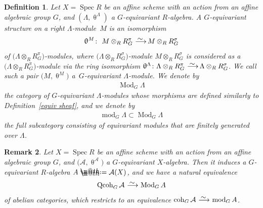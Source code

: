 \documentclass[11pt]{article}
\makeatletter
\numberwithin{equation}{section}
\newtheorem{dfn}{Definition}[section]
\newtheorem{rem}[dfn]{Remark}
\newcommand*{\defeq}{\mathrel{\rlap{%
 \raisebox{0.3ex}{$\m@th\cdot$}}%
 \raisebox{-0.3ex}{$\m@th\cdot$}}%
 =}
\numberwithin{equation}{section}
\newcommand{\Spec}{\operatorname{Spec}}
\newcommand{\coh}{\operatorname{coh}}
\newcommand{\Qcoh}{\operatorname{Qcoh}}
\newcommand{\Mod}{\operatorname{Mod}}
\newcommand{\fmod}{\operatorname{mod}}
\newcommand{\cA}{\mathcal{A}}
\newcommand{\simto}{\,\,\,\,\raisebox{4pt}{$\sim$}{\kern -1.1em \longrightarrow}\,}
\makeatother
\begin{document}
\begin{dfn}%
Let $X=\Spec R$ be an affine scheme with an action from an affine algebraic group $G$, and $(\Lambda,\uptheta^{\Lambda})$ a $G$-equivariant $R$-algebra. A {\it $G$-equivariant structure} on a right $\Lambda$-module~$M$ is an isomorphism
\begin{gather*}
\uptheta^M\colon\ M\otimes_RR_G^{\pi}\simto M\otimes_RR_G^{\sigma}
\end{gather*}
of $\big(\Lambda\otimes_RR_G^{\pi}\big)$-modules, where $\big(\Lambda\otimes_RR_G^{\sigma}\big)$-module $M\otimes_RR_G^{\sigma}$ is considered as a $\big(\Lambda\otimes_RR_G^{\pi}\big)$-mo\-dule via the ring isomorphism $\uptheta^{\Lambda}\colon \Lambda\otimes_RR_G^{\pi}\simto\Lambda\otimes_RR_G^{\sigma}$. We call such a pair $\big(M,\uptheta^M\big)$ a~{\it $G$-equivariant $\Lambda$-module}. We denote by
\begin{gather*}
\Mod_G\Lambda
\end{gather*}
the category of $G$-equivariant $\Lambda$-modules whose morphisms are defined similarly to Definition~\ref{equiv sheaf}, and we denote by
\begin{gather*}
\fmod_G\Lambda\subset \Mod_G\Lambda
\end{gather*}
the full subcategory consisting of equivariant modules that are finitely generated over $\Lambda$.
\end{dfn}

\begin{rem}
Let $X=\Spec R$ be an affine scheme with an action from an affine algebraic group $G$, and $\big(\cA,\uptheta^{\cA}\big)$ a $G$-equivariant $X$-algebra. Then it induces a $G$-equivariant $R$-algebra $A\defeq\cA(X)$, and we have a natural equivalence
\begin{gather*}
\Qcoh_G\cA\simto\Mod_GA
\end{gather*}
of abelian categories, which restricts to an equivalence $\coh_G\cA\simto\fmod_GA$.
\end{rem}
\vspace{1mm}
\end{document}

